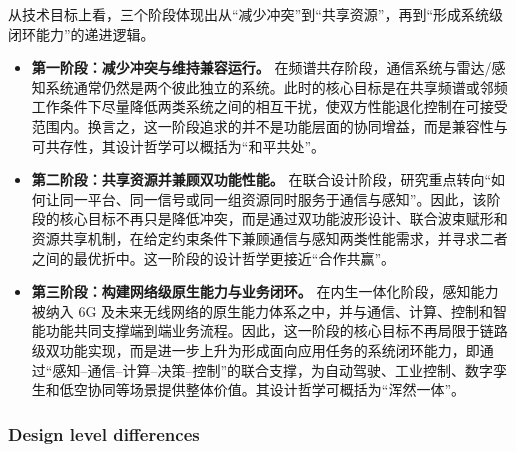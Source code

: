 从技术目标上看，三个阶段体现出从“减少冲突”到“共享资源”，再到“形成系统级闭环能力”的递进逻辑。
\begin{itemize}
    \item \textbf{第一阶段：减少冲突与维持兼容运行。}  
    在频谱共存阶段，通信系统与雷达/感知系统通常仍然是两个彼此独立的系统。此时的核心目标是在共享频谱或邻频工作条件下尽量降低两类系统之间的相互干扰，使双方性能退化控制在可接受范围内。换言之，这一阶段追求的并不是功能层面的协同增益，而是兼容性与可共存性，其设计哲学可以概括为“和平共处”。
    \item \textbf{第二阶段：共享资源并兼顾双功能性能。}  
    在联合设计阶段，研究重点转向“如何让同一平台、同一信号或同一组资源同时服务于通信与感知”\cite{Zhang2021ISAC6G,Hassanien2015dual}。因此，该阶段的核心目标不再只是降低冲突，而是通过双功能波形设计、联合波束赋形和资源共享机制，在给定约束条件下兼顾通信与感知两类性能需求，并寻求二者之间的最优折中。这一阶段的设计哲学更接近“合作共赢”。
    \item \textbf{第三阶段：构建网络级原生能力与业务闭环。}  
    在内生一体化阶段，感知能力被纳入 6G 及未来无线网络的原生能力体系之中，并与通信、计算、控制和智能功能共同支撑端到端业务流程\cite{Saad2020Vision6G,Zhang2020perceptive,Cui2024integrated}。因此，这一阶段的核心目标不再局限于链路级双功能实现，而是进一步上升为形成面向应用任务的系统闭环能力，即通过“感知--通信--计算--决策--控制”的联合支撑，为自动驾驶、工业控制、数字孪生和低空协同等场景提供整体价值。其设计哲学可概括为“浑然一体”。
\end{itemize}

\subsubsection{Design level differences}
\label{subsubsec:ch1-design-level-differences}


